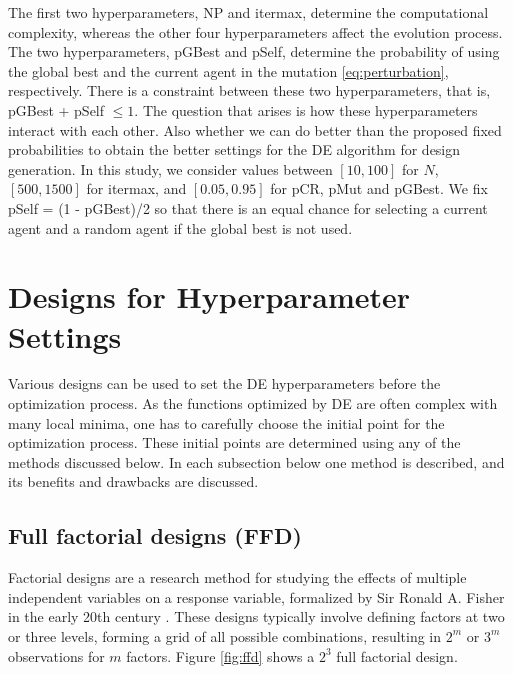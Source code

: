 \documentclass [PhD] {package/uclathes}
\begin{document}
{The first two hyperparameters, NP and itermax, determine the computational complexity, whereas the other four hyperparameters affect the evolution process. The two hyperparameters, pGBest and pSelf, determine the probability of using the global best and the current agent in the mutation  \eqref{eq:perturbation}, respectively. There is a constraint between these two hyperparameters, that is, pGBest + pSelf $\le 1$.}   The question that arises is how these hyperparameters interact with each other. Also whether we can do better than the proposed fixed probabilities to obtain the better settings for the DE algorithm for design generation.
In this study, we consider values between $[10,  100]$ for $N$, $[500, 1500]$ for itermax, and $[0.05, 0.95]$ for pCR, pMut and pGBest. We fix pSelf = (1 - pGBest)/2 so that there is an equal chance for selecting a current agent and a random agent if the global best is not used.

\section{Designs for Hyperparameter Settings}\label{sec:DE.designs}
Various designs can be used to set the DE hyperparameters before the optimization process. As the functions optimized by DE are often complex with many local minima, one has to carefully choose the initial point for the optimization process. These initial points are determined using any of the methods discussed below. In each subsection below one method is described, and its benefits and drawbacks are discussed.



\subsection*{Full factorial designs (FFD)}
Factorial designs are a research method for studying the effects of multiple independent variables on a response variable, formalized by Sir Ronald A. Fisher in the early 20th century \parencite{fisher1935}. These designs typically involve defining factors at two or three levels, forming a grid of all possible combinations, resulting in \(2^m\) or \(3^m\) observations for \(m\) factors. Figure \ref{fig:ffd} shows a $2^3$ full factorial design.
\end{document}
